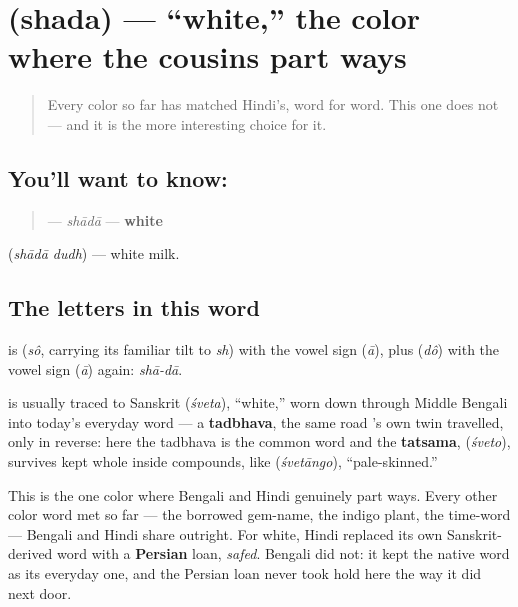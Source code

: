 \section[shada]{ (shada) — \textquotedblleft{}white,\textquotedblright{} the color where the cousins part ways}

\label{lesson:BN-C14-shada}



\begin{quote}
Every color so far has matched Hindi's, word for word. This one does not — and it is the more interesting choice for it.
\end{quote}

\subsection*{You'll want to know: }
\begin{quote}
\textbf{} — \emph{shādā} — \textbf{white}
\end{quote}

  (\emph{shādā dudh}) — white milk.

\subsection*{The letters in this word}
\textbf{} is \textbf{} (\emph{sô}, carrying its familiar tilt to \emph{sh}) with the vowel sign \textbf{} (\emph{ā}), plus \textbf{} (\emph{dô}) with the vowel sign \textbf{} (\emph{ā}) again: \emph{shā-dā}.

\begin{cousinweb}
\textbf{} is usually traced to Sanskrit \textbf{} (\emph{śveta}), \textquotedblleft{}white,\textquotedblright{} worn down through Middle Bengali into today's everyday word — a \textbf{tadbhava}, the same road 's own twin travelled, only in reverse: here the tadbhava is the common word and the \textbf{tatsama}, \textbf{} (\emph{śveto}), survives kept whole inside compounds, like \textbf{} (\emph{śvetāngo}), \textquotedblleft{}pale-skinned.\textquotedblright{}

This is the one color where Bengali and Hindi genuinely part ways. Every other color word met so far — the borrowed gem-name, the indigo plant, the time-word — Bengali and Hindi share outright. For white, Hindi replaced its own Sanskrit-derived word with a \textbf{Persian} loan, \emph{safed}. Bengali did not: it kept the native word as its everyday one, and the Persian loan never took hold here the way it did next door.
\end{cousinweb}

